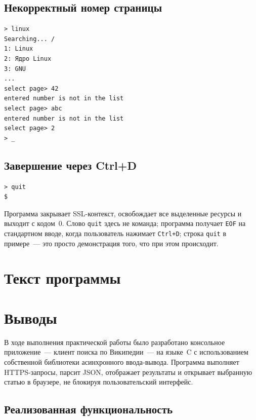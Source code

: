 \documentclass[12pt]{extarticle}
\renewcommand{\baselinestretch}{1.5}
\begin{document}
\subsection{Некорректный номер страницы}

\renewcommand{\baselinestretch}{1}
\begin{lstlisting}
> linux
Searching... /
1: Linux
2: Ядро Linux
3: GNU
...
select page> 42
entered number is not in the list
select page> abc
entered number is not in the list
select page> 2
> _
\end{lstlisting}
\renewcommand{\baselinestretch}{1.5}

\subsection{Завершение через Ctrl+D}

\renewcommand{\baselinestretch}{1}
\begin{lstlisting}
> quit
$
\end{lstlisting}
\renewcommand{\baselinestretch}{1.5}

Программа закрывает SSL-контекст, освобождает все выделенные
ресурсы и выходит с кодом~0. Слово \texttt{quit} здесь не
команда; программа получает \texttt{EOF} на стандартном вводе,
когда пользователь нажимает \texttt{Ctrl+D}; строка \texttt{quit}
в примере~--- это просто демонстрация того, что при этом
происходит.

\section{Текст программы}
\lstset{style=coolprint}
\renewcommand{\baselinestretch}{1}

\renewcommand{\baselinestretch}{1.5}

\section{Выводы}

В ходе выполнения практической работы было разработано консольное
приложение~--- клиент поиска по Википедии~--- на языке~C с
использованием собственной библиотеки асинхронного
ввода-вывода. Программа выполняет HTTPS-запросы, парсит JSON,
отображает результаты и открывает выбранную статью в браузере,
не блокируя пользовательский интерфейс.

\subsection*{Реализованная функциональность}
\end{document}
